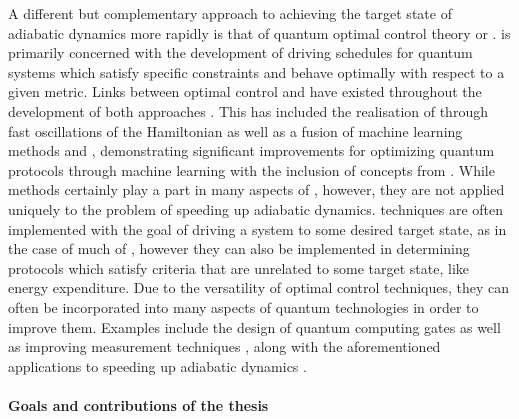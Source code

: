 A different but complementary approach to achieving the target state of adiabatic dynamics more rapidly is that of quantum optimal control theory or  \cite{glaser_training_2015, koch_quantum_2022}.  is primarily concerned with the development of driving schedules for quantum systems which satisfy specific constraints and behave optimally with respect to a given metric. Links between optimal control and  have existed throughout the development of both approaches \cite{stefanatos_frictionless_2010, stefanatos_shortcut_2021, zhang_connection_2021}. This has included the realisation of  through fast oscillations of the Hamiltonian \cite{petiziol_accelerated_2020, petiziol_fast_2018} as well as a fusion of machine learning methods and , demonstrating significant improvements for optimizing quantum protocols through machine learning with the inclusion of concepts from  \cite{bukov_reinforcement_2018, yao_reinforcement_2021, khait_optimal_2022}. While  methods certainly play a part in many aspects of , however, they are not applied uniquely to the problem of speeding up adiabatic dynamics.  techniques are often implemented with the goal of driving a system to some desired target state, as in the case of much of , however they can also be implemented in determining protocols which satisfy criteria that are unrelated to some target state, like energy expenditure. Due to the versatility of optimal control techniques, they can often be incorporated into many aspects of quantum technologies in order to improve them. Examples include the design of quantum computing gates \cite{pelegri_high-fidelity_2022} as well as improving measurement techniques \cite{wiseman_quantum_2009}, along with the aforementioned applications to speeding up adiabatic dynamics \cite{guery-odelin_shortcuts_2019}.


\paragraph*{Goals and contributions of the thesis}

